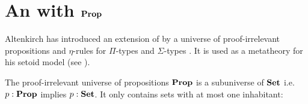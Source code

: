 











\section{An \itt with $\operatorname{\mathbf{Prop}}$}\label{ittprop}

Altenkirch has introduced an extension of \itt by a universe of proof-irrelevant propositions and $\eta$-rules for $\Pi$-types and $\Sigma$-types \cite{alti:lics99}. It is used as a metatheory for his setoid model (see ).

The proof-irrelevant universe of propositions $\operatorname{\mathbf{Prop}}$ is a subuniverse of  $\operatorname{\mathbf{Set}}$ i.e.\ $p : \operatorname{\mathbf{Prop}}$ implies $p : \operatorname{\mathbf{Set}}$. It only contains sets with at most one inhabitant:

